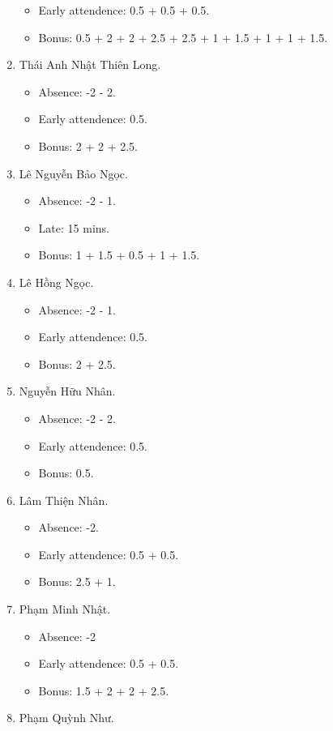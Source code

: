 \documentclass{article}
\begin{document}
\begin{enumerate}
\begin{itemize}
		\item Early attendence: 0.5 + 0.5 + 0.5.
		\item Bonus: 0.5 + 2 + 2 + 2.5 + 2.5 + 1 + 1.5 + 1 + 1 + 1.5.
	\end{itemize}
	\item {\sc Thái Anh Nhật Thiên Long.}
	\begin{itemize}
		\item Absence: -2 - 2.
		\item Early attendence: 0.5.
		\item Bonus: 2 + 2 + 2.5.
	\end{itemize}
	\item {\sc Lê Nguyễn Bảo Ngọc.}
	\begin{itemize}
		\item Absence: -2 - 1.
		\item Late: 15 mins.
		\item Bonus: 1 + 1.5 + 0.5 + 1 + 1.5.
	\end{itemize}
	\item {\sc Lê Hồng Ngọc.}
	\begin{itemize}
		\item Absence: -2 - 1.
		\item Early attendence: 0.5.
		\item Bonus: 2 + 2.5.
	\end{itemize}
	\item {\sc Nguyễn Hữu Nhân.}
	\begin{itemize}
		\item Absence: -2 - 2.
		\item Early attendence: 0.5.
		\item Bonus: 0.5.
	\end{itemize}
	\item {\sc Lâm Thiện Nhân.}
	\begin{itemize}
		\item Absence: -2.
		\item Early attendence: 0.5 + 0.5.
		\item Bonus: 2.5 + 1.
	\end{itemize}
	\item {\sc Phạm Minh Nhật.}
	\begin{itemize}
		\item Absence: -2
		\item Early attendence: 0.5 + 0.5.
		\item Bonus: 1.5 + 2 + 2 + 2.5.
	\end{itemize}
	\item {\sc Phạm Quỳnh Như.}

\end{enumerate}
\end{document}
